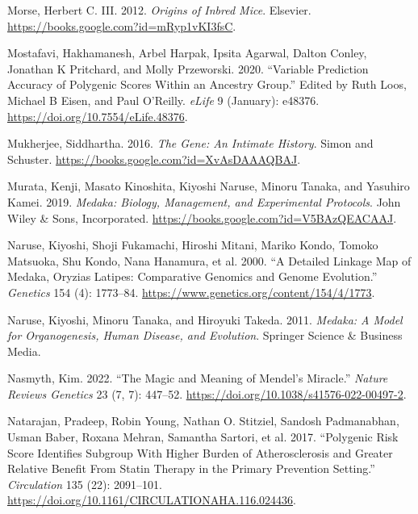 \documentclass[
]{book}
\newlength{\cslhangindent}
\newlength{\cslentryspacingunit} %
\newenvironment{CSLReferences}[2] %
 {%
  \setlength{\parindent}{0pt}
  \ifodd #1
  \let\oldpar\par
  \def\par{\hangindent=\cslhangindent\oldpar}
  \fi
  \setlength{\parskip}{#2\cslentryspacingunit}
 }%
 {}
\begin{document}
\begin{CSLReferences}{1}{0}
\leavevmode{}%
Morse, Herbert C. III. 2012. \emph{Origins of {Inbred Mice}}. {Elsevier}. \url{https://books.google.com?id=mRyp1vKI3fsC}.

\leavevmode{}%
Mostafavi, Hakhamanesh, Arbel Harpak, Ipsita Agarwal, Dalton Conley, Jonathan K Pritchard, and Molly Przeworski. 2020. {``Variable Prediction Accuracy of Polygenic Scores Within an Ancestry Group.''} Edited by Ruth Loos, Michael B Eisen, and Paul O'Reilly. \emph{eLife} 9 (January): e48376. \url{https://doi.org/10.7554/eLife.48376}.

\leavevmode{}%
Mukherjee, Siddhartha. 2016. \emph{The {Gene}: {An Intimate History}}. {Simon and Schuster}. \url{https://books.google.com?id=XvAsDAAAQBAJ}.

\leavevmode{}%
Murata, Kenji, Masato Kinoshita, Kiyoshi Naruse, Minoru Tanaka, and Yasuhiro Kamei. 2019. \emph{Medaka: {Biology}, {Management}, and {Experimental Protocols}}. {John Wiley \& Sons, Incorporated}. \url{https://books.google.com?id=V5BAzQEACAAJ}.

\leavevmode{}%
Naruse, Kiyoshi, Shoji Fukamachi, Hiroshi Mitani, Mariko Kondo, Tomoko Matsuoka, Shu Kondo, Nana Hanamura, et al. 2000. {``A {Detailed Linkage Map} of {Medaka}, {Oryzias} Latipes: {Comparative Genomics} and {Genome Evolution}.''} \emph{Genetics} 154 (4): 1773--84. \url{https://www.genetics.org/content/154/4/1773}.

\leavevmode{}%
Naruse, Kiyoshi, Minoru Tanaka, and Hiroyuki Takeda. 2011. \emph{Medaka: A Model for Organogenesis, Human Disease, and Evolution}. {Springer Science \& Business Media}.

\leavevmode{}%
Nasmyth, Kim. 2022. {``The Magic and Meaning of {Mendel}'s Miracle.''} \emph{Nature Reviews Genetics} 23 (7, 7): 447--52. \url{https://doi.org/10.1038/s41576-022-00497-2}.

\leavevmode{}%
Natarajan, Pradeep, Robin Young, Nathan O. Stitziel, Sandosh Padmanabhan, Usman Baber, Roxana Mehran, Samantha Sartori, et al. 2017. {``Polygenic {Risk Score Identifies Subgroup With Higher Burden} of {Atherosclerosis} and {Greater Relative Benefit From Statin Therapy} in the {Primary Prevention Setting}.''} \emph{Circulation} 135 (22): 2091--101. \url{https://doi.org/10.1161/CIRCULATIONAHA.116.024436}.


\end{CSLReferences}
\end{document}
